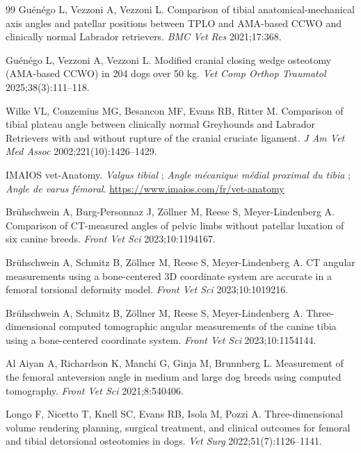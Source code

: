 \begin{thebibliography}{99}
 Guénégo L, Vezzoni A, Vezzoni L. Comparison of tibial anatomical-mechanical axis angles and
patellar positions between TPLO and AMA-based CCWO and clinically normal Labrador retrievers. \emph{BMC Vet Res}
2021;17:368. 

 Guénégo L, Vezzoni A, Vezzoni L. Modified cranial closing wedge osteotomy (AMA-based CCWO) in
204 dogs over 50 kg. \emph{Vet Comp Orthop Traumatol} 2025;38(3):111--118. 

 Wilke VL, Conzemius MG, Besancon MF, Evans RB, Ritter M. Comparison of tibial plateau angle
between clinically normal Greyhounds and Labrador Retrievers with and without rupture of the cranial cruciate ligament.
\emph{J Am Vet Med Assoc} 2002;221(10):1426--1429. 

 IMAIOS vet-Anatomy. \emph{Valgus tibial} ; \emph{Angle mécanique médial proximal du tibia} ;
\emph{Angle de varus fémoral}. \url{https://www.imaios.com/fr/vet-anatomy}

 Brühschwein A, Burg-Personnaz J, Zöllner M, Reese S, Meyer-Lindenberg A. Comparison of
CT-measured angles of pelvic limbs without patellar luxation of six canine breeds. \emph{Front Vet Sci}
2023;10:1194167. 

 Brühschwein A, Schmitz B, Zöllner M, Reese S, Meyer-Lindenberg A. CT angular measurements
using a bone-centered 3D coordinate system are accurate in a femoral torsional deformity model. \emph{Front Vet Sci}
2023;10:1019216. 

 Brühschwein A, Schmitz B, Zöllner M, Reese S, Meyer-Lindenberg A. Three-dimensional
computed tomographic angular measurements of the canine tibia using a bone-centered coordinate system. \emph{Front Vet
Sci} 2023;10:1154144. 

 Al Aiyan A, Richardson K, Manchi G, Ginja M, Brunnberg L. Measurement of the femoral anteversion
angle in medium and large dog breeds using computed tomography. \emph{Front Vet Sci} 2021;8:540406.

 Longo F, Nicetto T, Knell SC, Evans RB, Isola M, Pozzi A. Three-dimensional volume rendering
planning, surgical treatment, and clinical outcomes for femoral and tibial detorsional osteotomies in dogs. \emph{Vet
Surg} 2022;51(7):1126--1141. 


\end{thebibliography}
